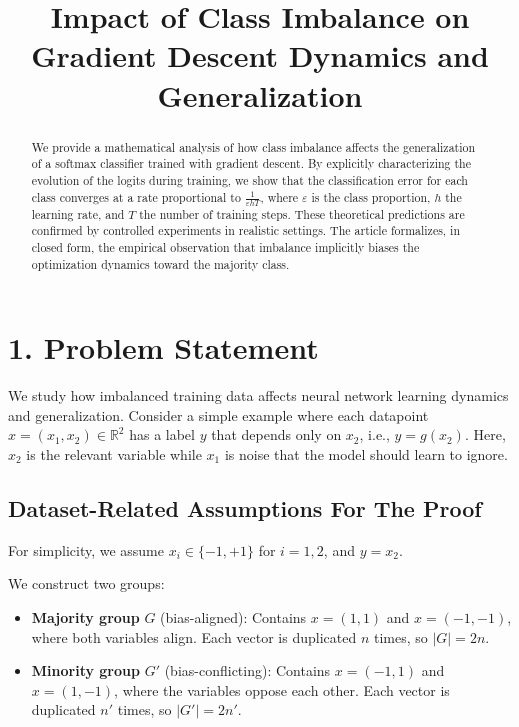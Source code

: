 \documentclass[11pt]{article}
\title{Impact of Class Imbalance on Gradient Descent Dynamics and Generalization}
\date{}
\begin{document}
\maketitle

\begin{abstract}
We provide a mathematical analysis of how class imbalance affects the generalization of a softmax classifier trained with gradient descent. By explicitly characterizing the evolution of the logits during training, we show that the classification error for each class converges at a rate proportional to $\frac{1}{\varepsilon h T}$, where $\varepsilon$ is the class proportion, $h$ the learning rate, and $T$ the number of training steps. These theoretical predictions are confirmed by controlled experiments in realistic settings. The article formalizes, in closed form, the empirical observation that imbalance implicitly biases the optimization dynamics toward the majority class.
\end{abstract}

\section*{1. Problem Statement}


We study how imbalanced training data affects neural network learning dynamics and generalization. Consider a simple example where each datapoint $x = (x_1, x_2) \in \mathbb{R}^2$ has a label $y$ that depends only on $x_2$, i.e., $y = g(x_2)$. Here, $x_2$ is the relevant variable while $x_1$ is noise that the model should learn to ignore.

\subsection*{Dataset-Related Assumptions For The Proof}
For simplicity, we assume $x_i \in \{-1, +1\}$ for $i = 1, 2$, and $y = x_2$.

We construct two groups:
\begin{itemize}
\item \textbf{Majority group} $G$ (bias-aligned): Contains $x = (1,1)$ and $x = (-1,-1)$, where both variables align. Each vector is duplicated $n$ times, so $|G| = 2n$.
\item \textbf{Minority group} $G'$ (bias-conflicting): Contains $x = (-1,1)$ and $x = (1,-1)$, where the variables oppose each other. Each vector is duplicated $n'$ times, so $|G'| = 2n'$.
\end{itemize}
\end{document}
